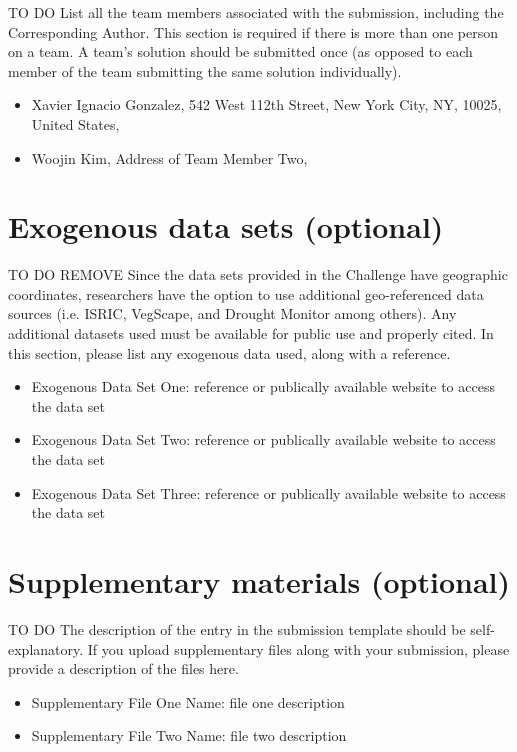 \documentclass[syngen,nonblindrev]{informs3-syngen}
\begin{document}
TO DO  List all the team members associated with the submission, including the Corresponding Author. This section is required if there is more than one person on a team.  A team's solution should be submitted once (as opposed to each member of the team submitting the same solution individually).   

\begin{itemize}
\item Xavier Ignacio Gonzalez, 542 West 112th Street, New York City, NY, 10025, United States, 
\item Woojin Kim, Address of Team Member Two,  
\end{itemize}



\section{Exogenous data sets (optional)}

TO DO  REMOVE Since the data sets provided in the Challenge have geographic coordinates, researchers have the option to use additional geo-referenced data sources (i.e. ISRIC, VegScape, and Drought Monitor among others).  Any additional datasets used must be available for public use and properly cited.  In this section, please  list any exogenous data used,  along with a reference.   

\begin{itemize}
\item Exogenous Data Set One:  reference or  publically available website to access the  data set
 \item Exogenous Data Set Two:  reference or  publically available website to access the  data set
\item  Exogenous Data Set Three:  reference or  publically available website to access the  data set
\end{itemize}



\section{Supplementary materials (optional)}

TO DO The description of the entry in the submission template should be self-explanatory.  If you upload  supplementary files  along with your submission, please provide a description of the files here.   

\begin{itemize}
\item Supplementary File One Name: file one description
\item Supplementary File Two Name: file two description 
\end{itemize}
\end{document}
